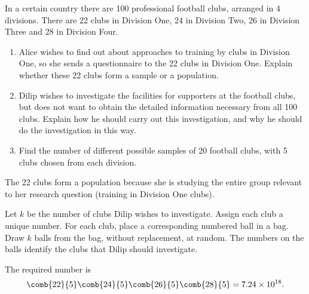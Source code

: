 \begin{problem}
    In a certain country there are 100 professional football clubs, arranged in 4 divisions. There are 22 clubs in Division One, 24 in Division Two, 26 in Division Three and 28 in Division Four.

    \begin{enumerate}
        \item Alice wishes to find out about approaches to training by clubs in Division One, so she sends a questionnaire to the 22 clubs in Division One. Explain whether these 22 clubs form a sample or a population.
        \item Dilip wishes to investigate the facilities for supporters at the football clubs, but does not want to obtain the detailed information necessary from all 100 clubs. Explain how he should carry out this investigation, and why he should do the investigation in this way.
        \item Find the number of different possible samples of 20 football clubs, with 5 clubs chosen from each division.
    \end{enumerate}
\end{problem}
\begin{solution}
    \begin{ppart}
        The 22 clubs form a population because she is studying the entire group relevant to her research question (training in Division One clubs).
    \end{ppart}
    \begin{ppart}
        Let $k$ be the number of clubs Dilip wishes to investigate. Assign each club a unique number. For each club, place a corresponding numbered ball in a bag. Draw $k$ balls from the bag, without replacement, at random. The numbers on the balls identify the clubs that Dilip should investigate.
    \end{ppart}
    \begin{ppart}
        The required number is \[\comb{22}{5} \comb{24}{5} \comb{26}{5} \comb{28}{5} = 7.24 \times 10^{18}.\]
    \end{ppart}
\end{solution}